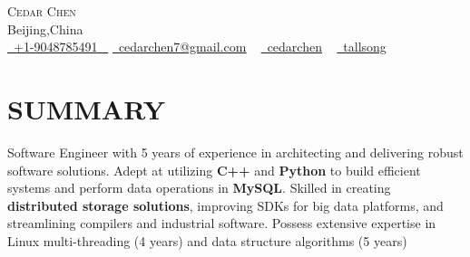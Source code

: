 \documentclass[a4paper,20pt]{article}
\newcommand{\resumeSubHeadingListStart}{\begin{itemize}[leftmargin=0.0in, label={}]}
\newcommand{\resumeSubHeadingListEnd}{\end{itemize}}
\begin{document}
\vfill


\begin{center}
    {\Huge \scshape Cedar Chen}  \href{https://tallsong.github.io/}{\raisebox{0.7\height}\faExternalLink }     \\ \vspace{1pt}
    Beijing,China \\ \vspace{1pt}
    \small \href{tel:+19048785401}{ \raisebox{-0.1\height}\faPhone\ \underline{+1-9048785491} ~} \href{mailto:cedarchen7@gmail.com}{\raisebox{-0.2\height}\faEnvelope\  \underline{cedarchen7@gmail.com}} ~ 
    \href{https://linkedin.com/in/cedarchen}{\raisebox{-0.2\height}\faLinkedinSquare\ \underline{cedarchen}}  ~
    \href{https://github.com/tallsong}{\raisebox{-0.2\height}\faGithub\ \underline{tallsong}} ~    
    \vspace{-8pt}
\end{center}





\section{SUMMARY}

Software Engineer with 5 years of experience in  architecting and delivering  robust software solutions. Adept at utilizing \textbf{C++} and \textbf{Python} to build efficient systems and perform data operations in \textbf{MySQL}. Skilled in creating \textbf{distributed storage solutions}, improving SDKs for big data platforms, and streamlining compilers and industrial software. Possess extensive expertise in Linux multi-threading (4 years) and data structure algorithms (5 years)

        \vspace*{2.0\multicolsep}

\vspace{10pt}
\vspace{-12pt}
\end{document}
